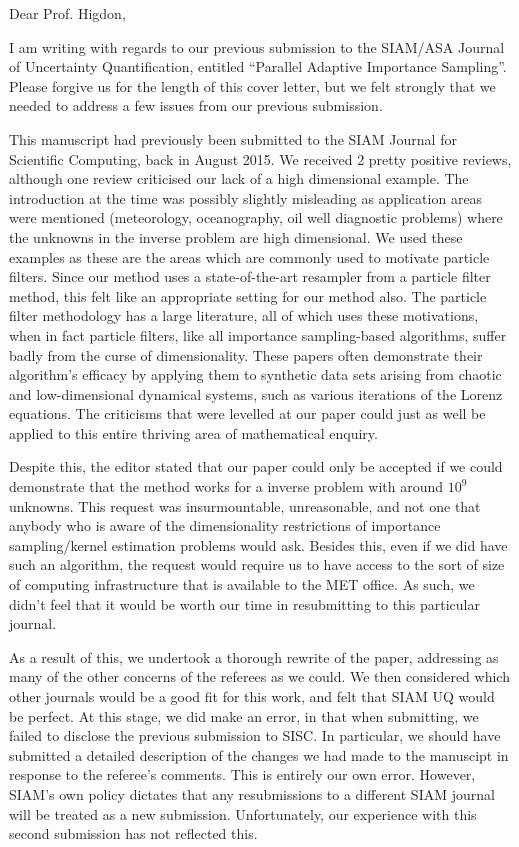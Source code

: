 \documentclass{letter}
\begin{document}
\date{}
\begin{letter}{ }

\opening{Dear Prof. Higdon,}

I am writing with regards to our previous submission to the SIAM/ASA Journal of Uncertainty Quantification, entitled ``Parallel Adaptive Importance Sampling''. Please forgive us for the length of this cover letter, but we felt strongly that we needed to address a few issues from our previous submission.

This manuscript had previously been submitted to the SIAM Journal for Scientific Computing, back in August 2015. We received 2 pretty positive reviews, although one review criticised our lack of a high dimensional example. The introduction at the time was possibly slightly misleading as application areas were mentioned (meteorology, oceanography, oil well diagnostic problems) where the unknowns in the inverse problem are high dimensional. We used these examples as these are the areas which are commonly used to motivate particle filters. Since our method uses a state-of-the-art resampler from a particle filter method, this felt like an appropriate setting for our method also. The particle filter methodology has a large literature, all of which uses these motivations, when in fact particle filters, like all importance sampling-based algorithms, suffer badly from the curse of dimensionality. These papers often demonstrate their algorithm's efficacy by applying them to synthetic data sets arising from chaotic and low-dimensional dynamical systems, such as various iterations of the Lorenz equations. The criticisms that were levelled at our paper could just as well be applied to this entire thriving area of mathematical enquiry.

Despite this, the editor stated that our paper could only be accepted if we could demonstrate that the method works for a inverse problem with around $10^9$ unknowns. This request was insurmountable, unreasonable, and not one that anybody who is aware of the dimensionality restrictions of importance sampling/kernel estimation problems would ask. Besides this, even if we did have such an algorithm, the request would require us to have access to the sort of size of computing infrastructure that is available to the MET office. As such, we didn't feel that it would be worth our time in resubmitting to this particular journal.

As a result of this, we undertook a thorough rewrite of the paper, addressing as many of the other concerns of the referees as we could. We then considered which other journals would be a good fit for this work, and felt that SIAM UQ would be perfect. At this stage, we did make an error, in that when submitting, we failed to disclose the previous submission to SISC. In particular, we should have submitted a detailed description of the changes we had made to the manuscipt in response to the referee's comments. This is entirely our own error. However, SIAM's own policy dictates that any resubmissions to a different SIAM journal will be treated as a new submission. Unfortunately, our experience with this second submission has not reflected this.


\end{letter}
\end{document}
